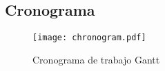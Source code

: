\begin{landscape}
\subsection{Cronograma}
\centering
	\begin{figure}
        \caption{Cronograma de trabajo Gantt} \label{fig:chronogram}
	\texttt{[image: chronogram.pdf]}
	\end{figure}
\end{landscape}

